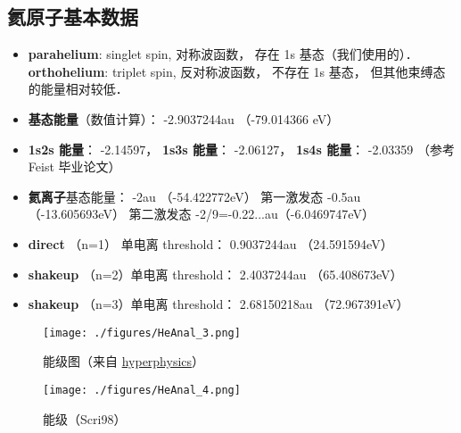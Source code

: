 

\subsection{氦原子基本数据}

\begin{itemize}
\item \textbf{parahelium}: singlet spin, 对称波函数， 存在 1s 基态（我们使用的）． \textbf{orthohelium}: triplet spin, 反对称波函数， 不存在 1s 基态， 但其他束缚态的能量相对较低．

\item \textbf{基态能量}（数值计算）： -2.9037244au （-79.014366 eV）

\item \textbf{1s2s 能量}： -2.14597， \textbf{1s3s 能量}： -2.06127， \textbf{1s4s 能量}： -2.03359 （参考 Feist 毕业论文）
\item \textbf{氦离子}基态能量： -2au （-54.422772eV） 第一激发态 -0.5au （-13.605693eV） 第二激发态 -2/9=-0.22...au（-6.0469747eV）

\item \textbf{direct} （n=1） 单电离 threshold： 0.9037244au （24.591594eV）

\item \textbf{shakeup} （n=2）单电离 threshold： 2.4037244au （65.408673eV）

\item \textbf{shakeup} （n=3）单电离 threshold： 2.68150218au （72.967391eV）
\end{itemize}

\begin{figure}[ht]
\centering
\texttt{[image: ./figures/HeAnal\_3.png]}
\caption{能级图（来自 \href{http://hyperphysics.phy-astr.gsu.edu/hbase/quantum/helium.html}{hyperphysics}）} \label{HeAnal_fig3}
\end{figure}

\begin{figure}[ht]
\centering
\texttt{[image: ./figures/HeAnal\_4.png]}
\caption{能级（Scri98）} \label{HeAnal_fig4}
\end{figure}

